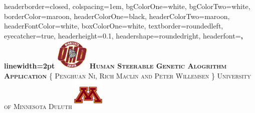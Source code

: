 \documentclass[landscape,a0paper,fontscale=0.285]{baposter} %
\begin{document}
	\begin{poster}
	{
	headerborder=closed, %
	colspacing=1em, %
	bgColorOne=white, %
	bgColorTwo=white, %
	borderColor=maroon,
	headerColorOne=black, %
	headerColorTwo=maroon,
	headerFontColor=white, %
	boxColorOne=white, %
	textborder=roundedleft, %
	eyecatcher=true, %
	headerheight=0.1\textheight, %
	headershape=roundedright, %
	headerfont=\Large\bf\textsc, %
	linewidth=2pt %
	}
	{\includegraphics[height=4em]{UMD.png}}
	{\bf\textsc{Human Steerable Genetic Alogrithm Application}\vspace{0.5em}} %
	{\textsc{\{ Penghuan Ni, Rich Maclin and Peter Willemsen \} \hspace{12pt} University of Minnesota Duluth}} %
	{\includegraphics[height=4em]{UMN.jpg}}


\end{poster}
\end{document}
